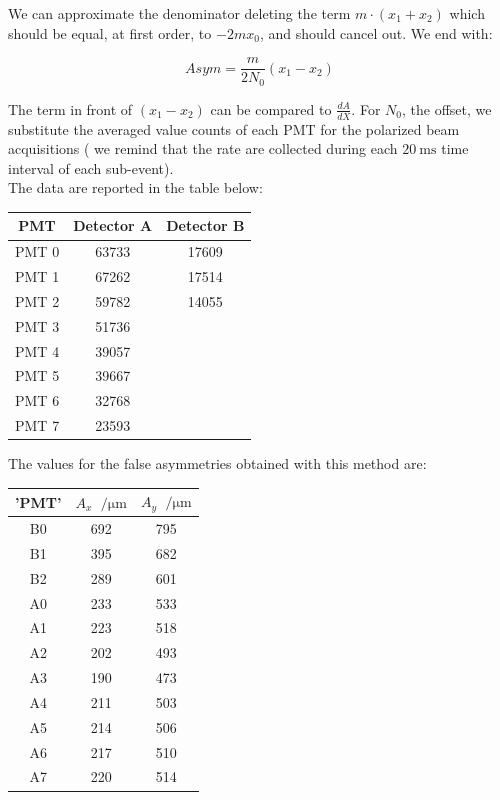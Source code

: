 We can approximate the denominator deleting the term $ m \cdot (x_{1} +  x_{2})$ which should be equal, at first order, to $- 2m x_{0}$, and should cancel out. We end with:

\begin{equation}
Asym = \dfrac{m}{2N_{0}}(x_{1} -  x_{2})
\end{equation}

The term in front of $(x_{1} - x_{2})$ can be compared to $\frac{dA}{dX}$. For $N_{0}$, the offset, we substitute the averaged value counts of each PMT for the polarized beam acquisitions ( we remind that the rate are collected during each $\SI{20}{\milli \second}$ time interval of each sub-event).\\
The data are reported in the table below:

\begin{center}
\begin{tabular}{|c|c|c|}
\hline 
PMT & Detector A & Detector B \\ 
\hline
PMT 0 & 63733 & 17609 \\ 
PMT 1 & 67262 & 17514 \\ 
PMT 2 & 59782 & 14055 \\ 
PMT 3 & 51736 & \\ 
PMT 4 & 39057 & \\ 
PMT 5 & 39667 & \\ 
PMT 6 & 32768 & \\ 
PMT 7 & 23593 & \\ 
\hline 
\end{tabular} 
\end{center}
 
The values for the false asymmetries obtained with this method are: 

\begin{table}[h]
\centering
\begin{tabular}{c|c|c}
\hline
 'PMT' & $A_{x}$ $\SI{}{\per \micro \meter}$&   $A_{y}$ $\SI{}{\per \micro \meter}$ \\
\hline
 B0 & 692 & 795 \\
 B1 & 395 & 682 \\
 B2 & 289 & 601 \\
 A0 & 233 & 533 \\
 A1 & 223 & 518 \\
 A2 & 202 & 493 \\
 A3 & 190 & 473 \\
 A4 & 211 & 503 \\
 A5 & 214 & 506 \\
 A6 & 217 & 510 \\
 A7 & 220 & 514 \\
\hline
\end{tabular}
\end{table}



